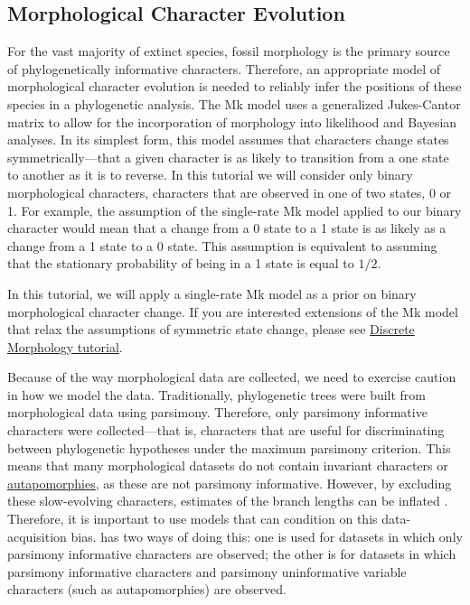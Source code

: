 \subsection{Morphological Character Evolution}\label{subsect:Intro-Morpho}

For the vast majority of extinct species, fossil morphology is the primary source of phylogenetically informative characters.
Therefore, an appropriate model of morphological character evolution is needed to reliably infer the positions of these species in a phylogenetic analysis.
The Mk model \citep{Lewis2001} uses a generalized Jukes-Cantor matrix to allow for the incorporation of morphology into likelihood and Bayesian analyses.
In its simplest form, this model assumes that characters change states symmetrically---that a given character is as likely to transition from a one state to another as it is to reverse.
In this tutorial we will consider only binary morphological characters, \IE characters that are observed in one of two states, 0 or 1.
For example, the assumption of the single-rate Mk model applied to our binary character would mean that a change from a 0 state to a 1 state is as likely as a change from a 1 state to a 0 state.
This assumption is equivalent to assuming that the stationary probability of being in a 1 state is equal to $1/2$.

In this tutorial, we will apply a single-rate Mk model as a prior on binary morphological character change. 
If you are interested extensions of the Mk model that relax the assumptions of symmetric state change, please see \href{https://github.com/revbayes/revbayes_tutorial/raw/master/tutorial_TeX/RB_Discrete_Morphology_Tutorial/RB_Discrete_Morphology.pdf}{Discrete Morphology tutorial}.


Because of the way morphological data are collected, we need to exercise caution in how we model the data. 
Traditionally, phylogenetic trees were built from morphological data using parsimony. 
Therefore, only parsimony informative characters were collected---that is, characters that are useful for discriminating between phylogenetic hypotheses under the maximum parsimony criterion.
This means that many morphological datasets do not contain invariant characters or \href{https://en.wikipedia.org/wiki/Autapomorphy}{autapomorphies}, as these are not parsimony informative. 
However, by excluding these slow-evolving characters, estimates of the branch lengths can be inflated \citep{Felsenstein1992,Lewis2001}.
Therefore, it is important to use models that can condition on this data-acquisition bias. 
\RevBayes has two ways of doing this: one is used for datasets in which only parsimony informative characters are observed; the other is for datasets in which parsimony informative characters and parsimony uninformative variable characters (such as autapomorphies) are observed.


